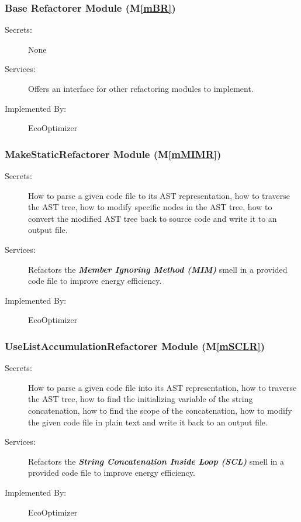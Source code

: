 \documentclass[12pt, titlepage]{article}
\newcommand{\mref}[1]{M\ref{#1}}
\begin{document}
\subsubsection{Base Refactorer Module (\mref{mBR})}


\begin{description}
    \item[Secrets:] None
    \item[Services:] Offers an interface for other refactoring modules to implement.
    \item[Implemented By:] EcoOptimizer
\end{description}

\subsubsection{MakeStaticRefactorer Module (\mref{mMIMR})}

\begin{description}
\item[Secrets:] How to parse a given code file to its AST representation, how to traverse the AST tree, how to modify specific nodes in the AST tree, how to convert the modified AST tree back to source code and write it to an output file.
\item[Services:] Refactors the \textit{\textbf{Member Ignoring Method (MIM)}} smell in a provided code file to improve energy efficiency.
\item[Implemented By:] EcoOptimizer
\end{description}

\subsubsection{UseListAccumulationRefactorer Module (\mref{mSCLR})}


\begin{description}
\item[Secrets:] How to parse a given code file into its AST representation, how to traverse the AST tree, how to find the initializing variable of the string concatenation, how to find the scope of the concatenation, how to modify the given code file in plain text and write it back to an output file.
\item[Services:] Refactors the \textbf{\textit{String Concatenation Inside Loop (SCL)}} smell in a provided code file to improve energy efficiency.
\item[Implemented By:] EcoOptimizer
\end{description}
\end{document}
